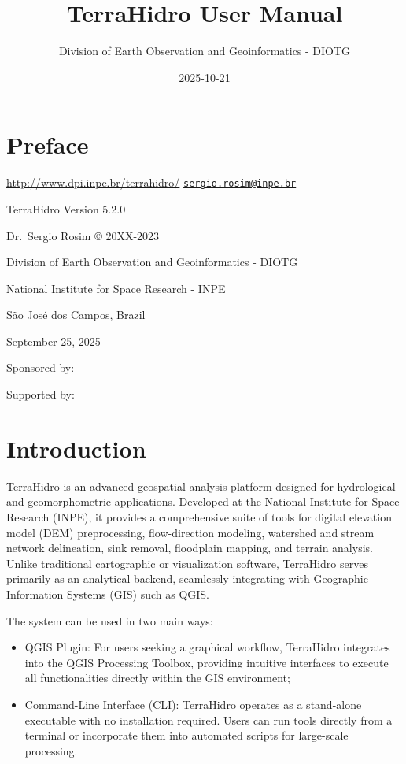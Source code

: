 \documentclass[
]{book}
\title{TerraHidro User Manual}
\author{Division of Earth Observation and Geoinformatics - DIOTG}
\date{2025-10-21}
\begin{document}
\maketitle

{
\setcounter{tocdepth}{1}
\tableofcontents
}
\chapter{Preface}\label{preface}

\url{http://www.dpi.inpe.br/terrahidro/} \textbar{} \href{mailto:sergio.rosim@inpe.br}{\nolinkurl{sergio.rosim@inpe.br}}

TerraHidro Version 5.2.0

Dr.~Sergio Rosim © 20XX-2023

Division of Earth Observation and Geoinformatics - DIOTG

National Institute for Space Research - INPE

São José dos Campos, Brazil

September 25, 2025

Sponsored by:

Supported by:

\chapter{Introduction}\label{introduction}

TerraHidro is an advanced geospatial analysis platform designed for hydrological and geomorphometric applications. Developed at the National Institute for Space Research (INPE), it provides a comprehensive suite of tools for digital elevation model (DEM) preprocessing, flow-direction modeling, watershed and stream network delineation, sink removal, floodplain mapping, and terrain analysis. Unlike traditional cartographic or visualization software, TerraHidro serves primarily as an analytical backend, seamlessly integrating with Geographic Information Systems (GIS) such as QGIS.

The system can be used in two main ways:

\begin{itemize}
\item
  QGIS Plugin: For users seeking a graphical workflow, TerraHidro integrates into the QGIS Processing Toolbox, providing intuitive interfaces to execute all functionalities directly within the GIS environment;
\item
  Command-Line Interface (CLI): TerraHidro operates as a stand-alone executable with no installation required. Users can run tools directly from a terminal or incorporate them into automated scripts for large-scale processing.
\end{itemize}
\end{document}
